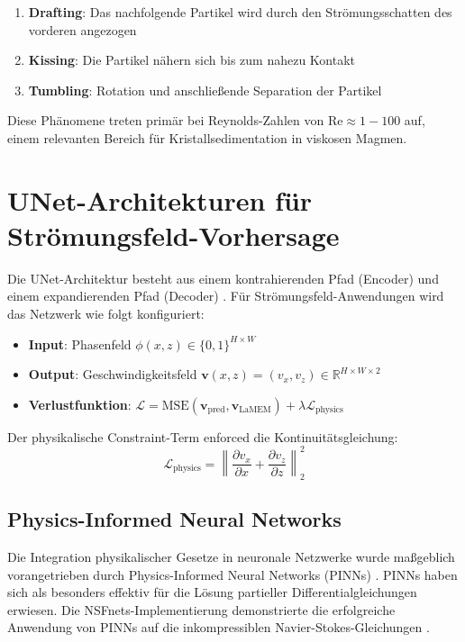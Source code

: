 \documentclass[12pt,twoside,openright]{scrreprt}
\theoremstyle{definition}
\theoremstyle{plain}
\newcommand{\reynolds}{\text{Re}}
\begin{document}
\begin{enumerate}
	\item \textbf{Drafting}: Das nachfolgende Partikel wird durch den Strömungsschatten des vorderen angezogen
	\item \textbf{Kissing}: Die Partikel nähern sich bis zum nahezu Kontakt
	\item \textbf{Tumbling}: Rotation und anschließende Separation der Partikel
\end{enumerate}

Diese Phänomene treten primär bei Reynolds-Zahlen von $\reynolds \approx 1-100$ auf, einem relevanten Bereich für Kristallsedimentation in viskosen Magmen.

\section{UNet-Architekturen für Strömungsfeld-Vorhersage}

Die UNet-Architektur besteht aus einem kontrahierenden Pfad (Encoder) und einem expandierenden Pfad (Decoder) \parencite{ronneberger2015unet}. Für Strömungsfeld-Anwendungen wird das Netzwerk wie folgt konfiguriert:

\begin{itemize}
	\item \textbf{Input}: Phasenfeld $\phi(x,z) \in \{0,1\}^{H \times W}$ 
	\item \textbf{Output}: Geschwindigkeitsfeld $\mathbf{v}(x,z) = (v_x, v_z) \in \mathbb{R}^{H \times W \times 2}$
	\item \textbf{Verlustfunktion}: $\mathcal{L} = \text{MSE}(\mathbf{v}_{\text{pred}}, \mathbf{v}_{\text{LaMEM}}) + \lambda \mathcal{L}_{\text{physics}}$
\end{itemize}

Der physikalische Constraint-Term enforced die Kontinuitätsgleichung:
\begin{equation}
\mathcal{L}_{\text{physics}} = \left\| \frac{\partial v_x}{\partial x} + \frac{\partial v_z}{\partial z} \right\|_2^2
\end{equation}

\subsection{Physics-Informed Neural Networks}

Die Integration physikalischer Gesetze in neuronale Netzwerke wurde maßgeblich vorangetrieben durch Physics-Informed Neural Networks (PINNs) \parencite{raissi2019physics}. PINNs haben sich als besonders effektiv für die Lösung partieller Differentialgleichungen erwiesen. Die NSFnets-Implementierung demonstrierte die erfolgreiche Anwendung von PINNs auf die inkompressiblen Navier-Stokes-Gleichungen \parencite{jin2021nsfnets}.
\end{document}
